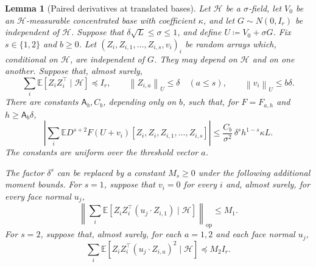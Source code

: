 \documentclass[11pt,letterpaper]{article}
\newtheorem{lemma}{Lemma}
\theoremstyle{remark}
\newcommand{\E}{\mathbb E}
\newcommand{\op}{\mathrm{op}}
\newcommand{\norm}[1]{\left\lVert#1\right\rVert}
\begin{document}
\begin{lemma}[Paired derivatives at translated bases]
\label{appx-an:lem:restoration}
Let \(\mathcal H\) be a \(\sigma\)-field, let \(V_0\) be an
\(\mathcal H\)-measurable concentrated base with coefficient
\(\kappa\), and let \(G\sim N(0,I_r)\) be independent of
\(\mathcal H\). Suppose that \(\delta\sqrt L\le\sigma\le1\),
and define \(U\coloneqq V_0+\sigma G\).
Fix \(s\in\{1,2\}\) and \(b\ge0\).
Let \((Z_i,Z_{i,1},\ldots,Z_{i,s},v_i)_i\) be random arrays
which, conditional on \(\mathcal H\), are independent of \(G\).
They may depend on \(\mathcal H\) and on one another.
Suppose that, almost surely,
\begin{equation}
 \sum_i\E[Z_iZ_i^\top\mid\mathcal H]\preceq I_r,
 \qquad \norm{Z_{i,a}}_U\le\delta\quad(a\le s),
 \qquad \norm{v_i}_U\le b\delta.
 \label{appx-an:conditional-budget}
\end{equation}
There are constants \(\mathsf A_b,C_b\), depending only on \(b\),
such that, for \(F=F_{a,h}\) and \(h\ge\mathsf A_b\delta\),
\begin{equation}
 \left|\sum_i\E D^{s+2}F(U+v_i)
         [Z_i,Z_i,Z_{i,1},\ldots,Z_{i,s}]\right|
 \le\frac{C_b}{\sigma^2}\,
                 \delta^s h^{1-s}\kappa L.
 \label{appx-an:restoration-bound}
\end{equation}
The constants are uniform over the threshold vector \(a\).

The factor \(\delta^s\) can be replaced by a constant \(M_s\ge0\)
under the following additional moment bounds.
For \(s=1\), suppose that \(v_i=0\) for every \(i\) and, almost
surely, for every face normal \(u_j\),
\begin{equation}
 \left\|\sum_i\E[Z_iZ_i^\top(u_j\cdot Z_{i,1})
                    \mid\mathcal H]\right\|_{\op}\le M_1.
 \label{appx-an:signed-cubic-budget}
\end{equation}
For \(s=2\), suppose that, almost surely, for each \(a=1,2\)
and each face normal \(u_j\),
\begin{equation}
 \sum_i\E[Z_iZ_i^\top(u_j\cdot Z_{i,a})^2
                    \mid\mathcal H]\preceq M_2I_r.
 \label{appx-an:weighted-fourth-budget}
\end{equation}
\end{lemma}
\end{document}
